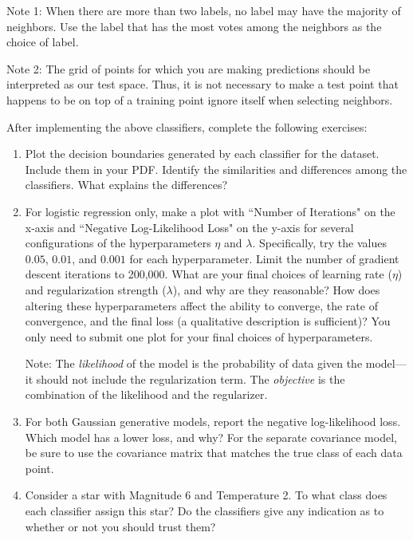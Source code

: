 \documentclass[submit]{harvardml}
\begin{document}
\begin{problem}
\begin{enumerate}[label=\alph*)]
  Note 1: When there are more than two labels, no label may have the
  majority of neighbors.  Use the label that has the most votes among
  the neighbors as the choice of label. 

  Note 2: The grid of points for which you are making predictions
  should be interpreted as our test space.  Thus, it is not necessary
  to make a test point that happens to be on top of a training point
  ignore itself when selecting neighbors.

\end{enumerate}

After implementing the above classifiers, complete the following exercises:

\begin{enumerate}
    \item Plot the decision boundaries generated by each classifier for the dataset. Include them in your PDF. 
    Identify the similarities and differences among the classifiers. What explains the differences?

    \item For logistic regression only, make a plot with ``Number of
      Iterations" on the x-axis and ``Negative Log-Likelihood Loss" on
      the y-axis for several configurations of the hyperparameters
      $\eta$ and $\lambda$.  Specifically, try the values $0.05$,
      $0.01$, and $0.001$ for each hyperparameter.  Limit the number
      of gradient descent iterations to 200,000.  What are your final
      choices of learning rate ($\eta$) and regularization strength
      ($\lambda$), and why are they reasonable? How does altering
      these hyperparameters affect the ability to converge, the rate
      of convergence, and the final loss (a qualitative description is
      sufficient)? You only need to submit one plot for your final
      choices of hyperparameters.

      Note: The \emph{likelihood} of the model is the probability of
      data given the model---it should not include the regularization
      term.  The \emph{objective} is the combination of the likelihood
      and the regularizer.
      
    \item For both Gaussian generative models, report the negative log-likelihood loss. Which model has a lower loss, and why?
      For the separate covariance model, be sure to use
      the covariance matrix that matches the true class of each data
      point.
    
    \item Consider a star with Magnitude 6 and Temperature 2.
      To what class does each classifier assign this star? Do the
      classifiers give any indication as to whether or not you should
  trust them?
\end{enumerate}
\end{problem}
\end{document}
